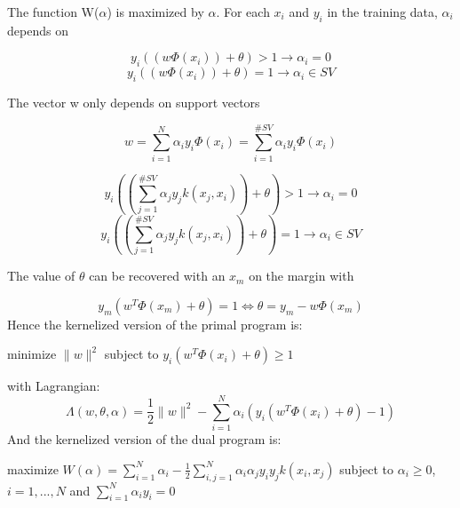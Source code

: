 \documentclass[11pt,abstract=on]{scrartcl}
\begin{document}
The function W($\alpha$) is maximized by $\alpha$. For each $x_i$ and $y_i$ in the training data, $\alpha_i$ depends on

\begin{equation*}
y_i((w \Phi(x_i)) + \theta) > 1 \rightarrow \alpha_i = 0
\end{equation*}
\begin{equation*}
y_i((w \Phi(x_i)) + \theta) = 1 \rightarrow \alpha_i \in SV
\end{equation*}

The vector w only depends on support vectors

\begin{equation*}
w = \sum\limits_{i=1}^{N} \alpha_i y_i \Phi(x_i) = \sum\limits_{i=1}^{\#SV} \alpha_i y_i \Phi(x_i)
\end{equation*}

\begin{equation*}
y_i((\sum\limits_{j=1}^{\#SV} \alpha_j y_j k(x_j, x_i)) + \theta) > 1 \rightarrow \alpha_i = 0
\end{equation*}
\begin{equation*}
y_i((\sum\limits_{j=1}^{\#SV} \alpha_j y_j k(x_j, x_i)) + \theta) = 1 \rightarrow \alpha_i \in SV
\end{equation*}

The value of $\theta$ can be recovered with an $x_m$ on the margin with

\begin{equation*}
y_m (w^T \Phi(x_m) + \theta) = 1 \Leftrightarrow \theta = y_m - w \Phi(x_m)
\end{equation*}
Hence the kernelized version of the primal program is:

minimize $\lVert w \rVert^2$ 
subject to $y_i(w^T\Phi(x_i) + \theta) \geq 1$

with Lagrangian:
\begin{equation*}
\Lambda(w,\theta,\alpha) = \frac{1}{2}  \lVert w \rVert^2 - \sum\limits_{i=1}^{N} \alpha_{i}(y_{i}(w^T \Phi(x_{i}) + \theta)-1)
\end{equation*}
And the kernelized version of the dual program is:

maximize $W(\alpha)= \sum\limits_{i=1}^{N} \alpha_i-\frac{1}{2} \sum\limits_{i,j=1}^{N} \alpha_i \alpha_j y_i y_j k(x_i, x_j)$
subject to $\alpha_i \geq 0$, $i=1,...,N$ and $\sum_{i=1}^N \alpha_i y_i =0$
\end{document}
